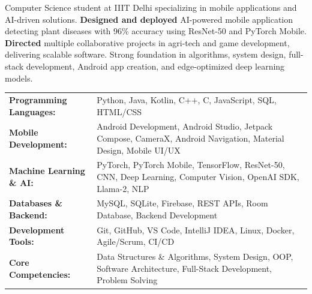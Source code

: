 \documentclass[10pt]{extarticle}
\begin{document}
\cvheader


\begin{contained}
\vspace{5pt}

Computer Science student at IIIT Delhi specializing in mobile applications and AI-driven solutions. \textbf{Designed and deployed} AI-powered mobile application detecting plant diseases with 96\% accuracy using ResNet-50 and PyTorch Mobile. \textbf{Directed} multiple collaborative projects in agri-tech and game development, delivering scalable software. Strong foundation in algorithms, system design, full-stack development, Android app creation, and edge-optimized deep learning models.

\end{contained}

\vspace{8pt}

\begin{contained}
\vspace{5pt}

\begin{tabular}{@{}p{}p{}@{}}
    \textbf{Programming Languages:} & Python, Java, Kotlin, C++, C, JavaScript, SQL, HTML/CSS \\[0pt]
    \textbf{Mobile Development:} & Android Development, Android Studio, Jetpack Compose, CameraX, Android Navigation, Material Design, Mobile UI/UX \\[0pt]
    \textbf{Machine Learning \& AI:} & PyTorch, PyTorch Mobile, TensorFlow, ResNet-50, CNN, Deep Learning, Computer Vision, OpenAI SDK, Llama-2, NLP \\[0pt]
    \textbf{Databases \& Backend:} & MySQL, SQLite, Firebase, REST APIs, Room Database, Backend Development \\[0pt]
    \textbf{Development Tools:} & Git, GitHub, VS Code, IntelliJ IDEA, Linux, Docker, Agile/Scrum, CI/CD \\[0pt]
    \textbf{Core Competencies:} & Data Structures \& Algorithms, System Design, OOP, Software Architecture, Full-Stack Development, Problem Solving \\ 
\end{tabular}
\end{contained}
\end{document}

